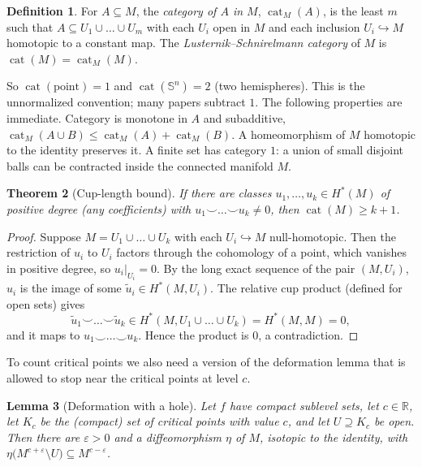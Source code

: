 \documentclass[11pt,openany]{book}
\theoremstyle{plain}
\newtheorem{theorem}{Theorem}[chapter]
\newtheorem{lemma}[theorem]{Lemma}
\theoremstyle{definition}
\newtheorem{definition}[theorem]{Definition}
\theoremstyle{remark}
\newcommand{\R}{\mathbb{R}}
\newcommand{\Sph}{\mathbb{S}}          %
\begin{document}
\begin{definition}\label{TOP:def:cat}
For $A\subseteq M$, the \emph{category of $A$ in $M$}, $\operatorname{cat}_M(A)$, is the least $m$ such that
$A\subseteq U_1\cup\dots\cup U_m$ with each $U_i$ open in $M$ and each inclusion $U_i\hookrightarrow M$
homotopic to a constant map. The \emph{Lusternik--Schnirelmann category} of $M$ is
$\operatorname{cat}(M)=\operatorname{cat}_M(M)$.
\end{definition}

So $\operatorname{cat}(\text{point})=1$ and $\operatorname{cat}(\Sph^n)=2$ (two hemispheres). This is the
unnormalized convention; many papers subtract $1$. The following properties are immediate.
Category is monotone in $A$ and subadditive, $\operatorname{cat}_M(A\cup B)\le\operatorname{cat}_M(A)+
\operatorname{cat}_M(B)$. A homeomorphism of $M$ homotopic to the identity preserves it. A finite set has
category $1$: a union of small disjoint balls can be contracted inside the connected manifold $M$.

\begin{theorem}[Cup-length bound]\label{TOP:thm:cuplength}
If there are classes $u_1,\dots,u_k\in H^*(M)$ of positive degree (any coefficients) with
$u_1\smile\dots\smile u_k\neq0$, then $\operatorname{cat}(M)\ge k+1$.
\end{theorem}

\begin{proof}
Suppose $M=U_1\cup\dots\cup U_k$ with each $U_i\hookrightarrow M$ null-homotopic. Then the restriction
of $u_i$ to $U_i$ factors through the cohomology of a point, which vanishes in positive degree, so
$u_i|_{U_i}=0$. By the long exact sequence of the pair $(M,U_i)$, $u_i$ is the image of some
$\tilde u_i\in H^*(M,U_i)$. The relative cup product (defined for open sets) gives
\[
  \tilde u_1\smile\dots\smile\tilde u_k\in H^*(M,U_1\cup\dots\cup U_k)=H^*(M,M)=0,
\]
and it maps to $u_1\smile\dots\smile u_k$. Hence the product is $0$, a contradiction.
\end{proof}

To count critical points we also need a version of the deformation lemma that is allowed to stop near the
critical points at level $c$.

\begin{lemma}[Deformation with a hole]\label{TOP:lem:hole}
Let $f$ have compact sublevel sets, let $c\in\R$, let $K_c$ be the (compact) set of critical points
with value $c$, and let $U\supseteq K_c$ be open. Then there are $\varepsilon>0$ and a diffeomorphism
$\eta$ of $M$, isotopic to the identity, with $\eta\big(M^{c+\varepsilon}\setminus U\big)\subseteq M^{c-\varepsilon}$.
\end{lemma}
\end{document}
